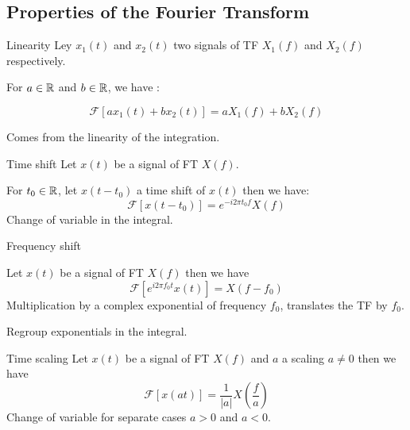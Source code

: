 \subsection{Properties of the Fourier Transform}
\label{sec:}

\begin{block}{Linearity}
    Ley $x_1(t)$ and $x_2(t)$ two signals of TF $X_1(f)$ and $X_2(f)$ respectively. 
  
  For $a \in \mathbb{R}$ and $b \in \mathbb{R}$, we have :
  
  $$
  \mathcal{F}[a x_1(t) + b x_2(t)]=  a X_1(f) + b X_2(f)
  $$
  
    Comes from the linearity of the integration.
  \end{block}
  
  
  \begin{block}{Time shift}
    Let $x(t)$ be a signal of FT $X(f)$. 
  
  For $t_0 \in \mathbb{R}$, let $x(t-t_0)$ a time shift of  $x(t)$ then we have:
  $$
  \mathcal{F}[x(t-t_0)]= e^{-i 2 \pi t_0f}X(f)
  $$
    Change of variable in the integral.
  \end{block}
  

  


  \begin{block}{Frequency shift}

    Let $x(t)$ be a signal of FT $X(f)$ then we have 
  $$
  \mathcal{F}\left[e^{i 2 \pi f_0t} x(t) \right]= X(f-f_0)
  $$
  Multiplication by a complex exponential of frequency $f_0$, translates the TF by
  $f_0$.
  
     Regroup exponentials in the integral.
\end{block}


\begin{block}{Time scaling}
  Let $x(t)$ be a signal of FT $X(f)$  and $a$ a scaling $a \neq 0$ then we have
$$
\mathcal{F}[x(at)]= \frac{1}{|a|} X\left(\frac{f}{a}\right)
$$
    Change of variable for separate cases $a>0$ and $a < 0$.
\end{block}




